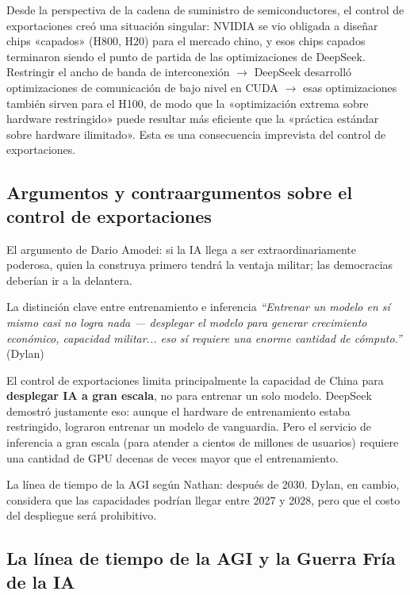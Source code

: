 Desde la perspectiva de la cadena de suministro de semiconductores, el control de exportaciones creó una situación singular: NVIDIA se vio obligada a diseñar chips «capados» (H800, H20) para el mercado chino, y esos chips capados terminaron siendo el punto de partida de las optimizaciones de DeepSeek. Restringir el ancho de banda de interconexión $\to$ DeepSeek desarrolló optimizaciones de comunicación de bajo nivel en CUDA $\to$ esas optimizaciones también sirven para el H100, de modo que la «optimización extrema sobre hardware restringido» puede resultar más eficiente que la «práctica estándar sobre hardware ilimitado». Esta es una consecuencia imprevista del control de exportaciones.

\subsection{Argumentos y contraargumentos sobre el control de exportaciones}

El argumento de Dario Amodei: si la IA llega a ser extraordinariamente poderosa, quien la construya primero tendrá la ventaja militar; las democracias deberían ir a la delantera.

\begin{importantbox}{La distinción clave entre entrenamiento e inferencia}
\textit{``Entrenar un modelo en sí mismo casi no logra nada — desplegar el modelo para generar crecimiento económico, capacidad militar... eso sí requiere una enorme cantidad de cómputo.''} (Dylan)

El control de exportaciones limita principalmente la capacidad de China para \textbf{desplegar IA a gran escala}, no para entrenar un solo modelo. DeepSeek demostró justamente eso: aunque el hardware de entrenamiento estaba restringido, lograron entrenar un modelo de vanguardia. Pero el servicio de inferencia a gran escala (para atender a cientos de millones de usuarios) requiere una cantidad de GPU decenas de veces mayor que el entrenamiento.
\end{importantbox}

La línea de tiempo de la AGI según Nathan: después de 2030. Dylan, en cambio, considera que las capacidades podrían llegar entre 2027 y 2028, pero que el costo del despliegue será prohibitivo.

\subsection{La línea de tiempo de la AGI y la Guerra Fría de la IA}

